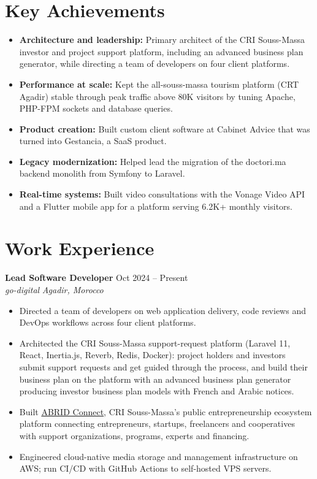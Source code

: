 \documentclass[10pt,a4paper]{article}
\newcommand{\entry}[4]{%
  \textbf{#1} \hfill #2\\
  \textit{#3} \hfill \textit{#4}\par\vspace{1pt}}
\begin{document}
\section{Key Achievements}
\begin{itemize}
  \item \textbf{Architecture and leadership:} Primary architect of the CRI Souss-Massa investor and project support
        platform, including an advanced business plan generator, while directing a team of developers on four client platforms.
  \item \textbf{Performance at scale:} Kept the all-souss-massa tourism platform (CRT Agadir) stable through peak traffic
        above 80K visitors by tuning Apache, PHP-FPM sockets and database queries.
  \item \textbf{Product creation:} Built custom client software at Cabinet Advice that was turned into Gestancia, a SaaS product.
  \item \textbf{Legacy modernization:} Helped lead the migration of the doctori.ma backend monolith from Symfony to Laravel.
  \item \textbf{Real-time systems:} Built video consultations with the Vonage Video API and a Flutter mobile app for a
        platform serving 6.2K+ monthly visitors.
\end{itemize}

\section{Work Experience}

\entry{Lead Software Developer}{Oct 2024 -- Present}{go-digital}{Agadir, Morocco}
\begin{itemize}
  \item Directed a team of developers on web application delivery, code reviews and DevOps workflows across four client platforms.
  \item Architected the CRI Souss-Massa support-request platform (Laravel 11, React, Inertia.js, Reverb, Redis, Docker):
        project holders and investors submit support requests and get guided through the process, and build their business
        plan on the platform with an advanced business plan generator producing investor business plan models with French and Arabic notices.
  \item Built \href{https://www.abridsoussmassa.com/en}{ABRID Connect}, CRI Souss-Massa's public entrepreneurship ecosystem platform
        connecting entrepreneurs, startups, freelancers and cooperatives with support organizations, programs, experts and financing.
  \item Engineered cloud-native media storage and management infrastructure on AWS; run CI/CD with GitHub Actions to self-hosted VPS servers.
\end{itemize}
\end{document}
